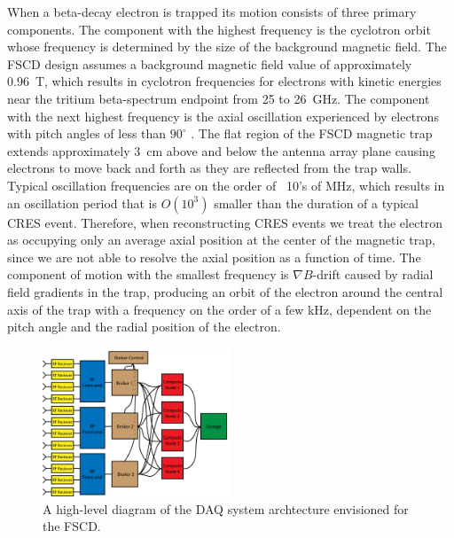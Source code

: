 When a beta-decay electron is trapped its motion consists of three primary components. The component with the highest frequency is the cyclotron orbit whose frequency is determined by the size of the background magnetic field. The FSCD design assumes a background magnetic field value of approximately 0.96~T, which results in cyclotron frequencies for electrons with kinetic energies near the tritium beta-spectrum endpoint from 25 to 26~GHz. The component with the next highest frequency is the axial oscillation experienced by electrons with pitch angles of less than $90^\circ$ \cite{p8pheno}. The flat region of the FSCD magnetic trap extends approximately 3~cm above and below the antenna array plane causing electrons to move back and forth as they are reflected from the trap walls. Typical oscillation frequencies are on the order of ~10's of MHz, which results in an oscillation period that is $O(10^3)$ smaller than the duration of a typical CRES event. Therefore, when reconstructing CRES events we treat the electron as occupying only an average axial position at the center of the magnetic trap, since we are not able to resolve the axial position as a function of time. The component of motion with the smallest frequency is $\nabla B$-drift caused by radial field gradients in the trap, producing an orbit of the electron around the central axis of the trap with a frequency on the order of a few kHz, dependent on the pitch angle and the radial position of the electron. 

\begin{figure}[htbp]
    \centering
    \includegraphics[width=0.5\textwidth]{figs/Chapter-4/230108_daq_system_overview.png}
    \caption{A high-level diagram of the DAQ system archtecture envisioned for the FSCD.}
    \label{fig:chap4-daq-system-overview}
\end{figure}

